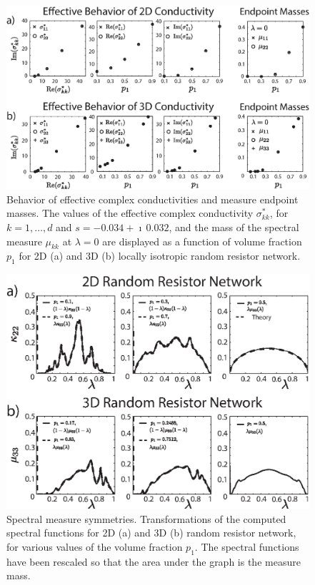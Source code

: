 \documentclass{cmslatex}
\begin{document}
%
\begin{figure}[t]
  \centerline{\includegraphics[scale=0.68]{Effective_Parameter_Behavior_4_75GHz.eps}} 
\caption{Behavior of effective complex conductivities and measure
  endpoint masses. The values of the effective complex conductivity
  $\sigma^*_{kk}$, for $k=1,\ldots,d$ and $s=-0.034+\imath\,0.032$, and the mass of the
  spectral measure $\mu_{kk}$ at $\lambda=0$ are displayed as a function of volume
  fraction $p_1$   for 2D (a) and 3D (b) locally isotropic random
  resistor network.    
        }
\label{fig:Effective_Parameter_Behavior}
\end{figure}
%



%
\begin{figure}[t]
  \centerline{\includegraphics[scale=0.97]{Spectral_Function_Symmetries.eps}} 
\caption{Spectral measure symmetries. Transformations of the computed
  spectral functions for 2D (a) and 3D (b) random resistor network,
  for various values of the volume fraction $p_1$. The spectral functions have been
  rescaled so that the area under the graph is the measure mass.   
        }
\label{fig:Spectral_Function_Symmetries}
\end{figure}
%
\end{document}
